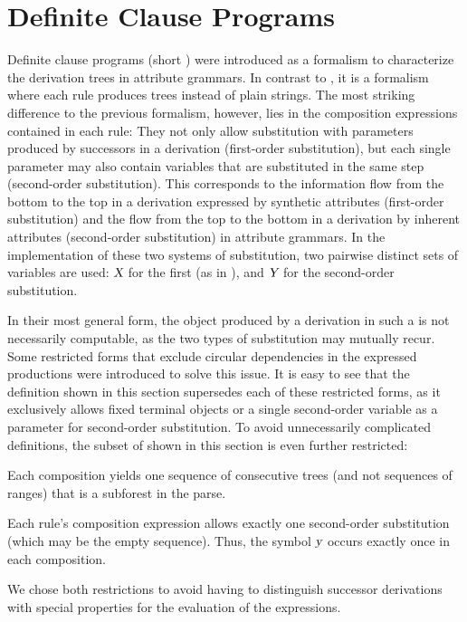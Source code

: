 \documentclass[../../document.tex]{subfiles}
\begin{document}
    \section{Definite Clause Programs}\label{sec:grammar:dcp}
    Definite clause programs (short ) were introduced as a formalism to characterize the derivation trees in attribute grammars. \citep{Der85}
    In contrast to , it is a formalism where each rule produces trees instead of plain strings.
    The most striking difference to the previous formalism, however, lies in the composition expressions contained in each rule:
    They not only allow substitution with parameters produced by successors in a derivation (first-order substitution), but each single parameter may also contain variables that are substituted in the same step (second-order substitution).
    This corresponds to the information flow from the bottom to the top in a derivation expressed by synthetic attributes (first-order substitution) and the flow from the top to the bottom in a derivation by inherent attributes (second-order substitution) in attribute grammars. \citep[cf.\@][Section~1]{Der88}
    In the implementation of these two systems of substitution, two pairwise distinct sets of variables are used: \(\textsl{X}\) for the first (as in ), and \(\textsl{Y}\) for the second-order substitution.

    In their most general form, the object produced by a derivation in such a  is not necessarily computable, as the two types of substitution may mutually recur.
    Some restricted forms that exclude circular dependencies in the expressed productions were introduced to solve this issue. \citep[Section~3.4 discusses non-circular attribute grammars]{Cou82}
    It is easy to see that the definition shown in this section supersedes each of these restricted forms, as it exclusively allows fixed terminal objects or a single second-order variable as a parameter for second-order substitution.
    To avoid unnecessarily complicated definitions, the subset of  shown in this section is even further restricted:
    \begin{inparaenum}
        \item Each composition yields one sequence of consecutive trees (and not sequences of ranges) that is a subforest in the parse.
        \item Each rule's composition expression allows exactly one second-order substitution (which may be the empty sequence). Thus, the symbol \(\textsl{y}\) occurs exactly once in each composition.
    \end{inparaenum}
    We chose both restrictions to avoid having to distinguish successor derivations with special properties for the evaluation of the expressions.
\end{document}
